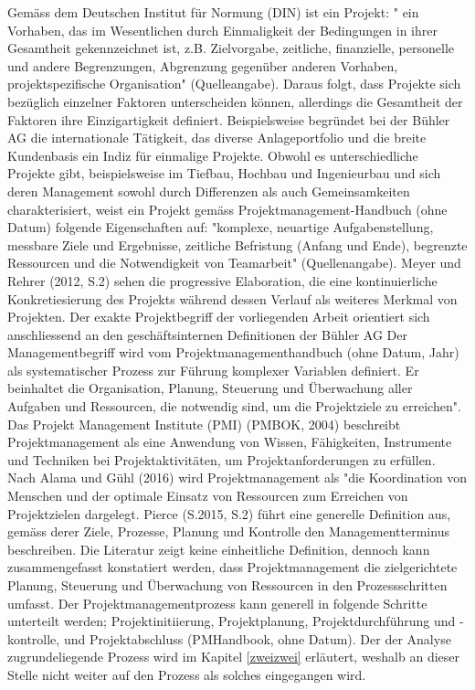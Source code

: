 Gemäss dem Deutschen Institut für Normung (DIN) ist ein Projekt: " ein Vorhaben, das im Wesentlichen durch Einmaligkeit der Bedingungen in ihrer Gesamtheit gekennzeichnet ist, z.B. Zielvorgabe, zeitliche, finanzielle, personelle und andere Begrenzungen, Abgrenzung gegenüber anderen Vorhaben, projektspezifische Organisation" (Quelleangabe). Daraus folgt, dass Projekte sich bezüglich einzelner Faktoren unterscheiden können, allerdings die Gesamtheit der Faktoren ihre Einzigartigkeit definiert. Beispielsweise begründet bei der Bühler AG die internationale Tätigkeit, das diverse Anlageportfolio und die breite Kundenbasis ein Indiz für einmalige Projekte. Obwohl es unterschiedliche Projekte gibt, beispielsweise im Tiefbau, Hochbau und Ingenieurbau und sich deren Management sowohl durch Differenzen als auch Gemeinsamkeiten charakterisiert, weist ein Projekt gemäss Projektmanagement-Handbuch (ohne Datum) folgende Eigenschaften auf: "komplexe, neuartige Aufgabenstellung, messbare Ziele und Ergebnisse, zeitliche Befristung (Anfang und Ende), begrenzte Ressourcen und die Notwendigkeit von Teamarbeit" (Quellenangabe). Meyer und Rehrer (2012, S.2) sehen die progressive Elaboration, die eine kontinuierliche Konkretiesierung des Projekts während dessen Verlauf als weiteres Merkmal von Projekten. Der exakte Projektbegriff der vorliegenden Arbeit orientiert sich anschliessend an den geschäftsinternen Definitionen der Bühler AG
\newline
Der Managementbegriff wird vom Projektmanagementhandbuch (ohne Datum, Jahr) als systematischer Prozess zur Führung komplexer Variablen definiert. Er beinhaltet die Organisation, Planung, Steuerung und Überwachung aller Aufgaben und Ressourcen, die notwendig sind, um die Projektziele zu erreichen". Das Projekt Management Institute (PMI) (PMBOK, 2004) beschreibt Projektmanagement als eine Anwendung von Wissen, Fähigkeiten, Instrumente und Techniken bei Projektaktivitäten, um Projektanforderungen zu erfüllen. Nach Alama und Gühl (2016) wird Projektmanagement als "die Koordination von Menschen und der optimale Einsatz von Ressourcen zum Erreichen von Projektzielen dargelegt. Pierce (S.2015, S.2) führt eine generelle Definition aus, gemäss derer Ziele, Prozesse, Planung und Kontrolle den Managementterminus beschreiben. Die Literatur zeigt keine einheitliche Definition, dennoch kann zusammengefasst konstatiert werden, dass Projektmanagement die zielgerichtete Planung, Steuerung und Überwachung von  Ressourcen in den Prozessschritten umfasst. Der Projektmanagementprozess kann generell in folgende Schritte unterteilt werden; Projektinitiierung, Projektplanung, Projektdurchführung und -kontrolle, und Projektabschluss (PMHandbook, ohne Datum). Der der Analyse zugrundeliegende Prozess wird im Kapitel \ref{zweizwei} erläutert, weshalb an dieser Stelle nicht weiter auf den Prozess als solches eingegangen wird. 
